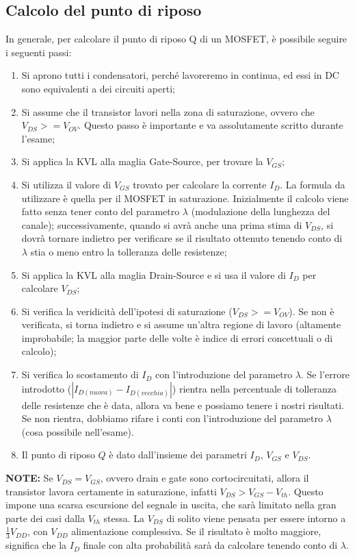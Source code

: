\documentclass[a4paper,twocolumn,notitlepage]{book}
\begin{document}
	\subsection*{Calcolo del punto di riposo}
	In generale, per calcolare il punto di riposo Q di un MOSFET, è possibile seguire i seguenti passi:
	\begin{enumerate}
		\item
		Si aprono tutti i condensatori, perché lavoreremo in continua, ed essi in DC sono equivalenti a dei circuiti aperti;
		\item
		Si assume che il transistor lavori nella zona di saturazione, ovvero che $V_{DS} >= V_{OV}$. Questo passo è importante e va assolutamente scritto durante l'esame;
		\item
		Si applica la KVL alla maglia Gate-Source, per trovare la $V_{GS}$;
		\item
		Si utilizza il valore di $V_{GS}$ trovato per calcolare la corrente $I_D$. La formula da utilizzare è quella per il MOSFET in saturazione.\newline
		Inizialmente il calcolo viene fatto senza tener conto del parametro $\lambda$ (modulazione della lunghezza del canale); successivamente, quando si avrà anche una prima stima di $V_{DS}$, si dovrà tornare indietro per verificare se il risultato ottenuto tenendo conto di $\lambda$ stia o meno entro la tolleranza delle resistenze;
		\item
		Si applica la KVL alla maglia Drain-Source e si usa il valore di $I_D$ per calcolare $V_{DS}$;
		\item
		Si verifica la veridicità dell'ipotesi di saturazione ($V_{DS} >= V_{OV}$). Se non è verificata, si torna indietro e si assume un'altra regione di lavoro (altamente improbabile; la maggior parte delle volte è indice di errori concettuali o di calcolo);
		\item
		Si verifica lo scostamento di $I_{D}$ con l'introduzione del parametro $\lambda$. Se l'errore introdotto ($|I_{D (nuova)} - I_{D (vecchia)}|$) rientra nella percentuale di tolleranza delle resistenze che è data, allora va bene e possiamo tenere i nostri risultati.\newline
		Se non rientra, dobbiamo rifare i conti con l'introduzione del parametro $\lambda$ (cosa possibile nell'esame).
		\item
		Il punto di riposo $Q$ è dato dall'insieme dei parametri $I_D$, $V_{GS}$ e $V_{DS}$.
		
			
		
	\end{enumerate}\medskip
	\textbf{NOTE:} Se $V_{DS}=V_{GS}$, ovvero drain e gate sono cortocircuitati, allora il transistor lavora certamente in saturazione, infatti $V_{DS} > V_{GS} - V_{th}$. Questo impone una scarsa escursione del segnale in uscita, che sarà limitato nella gran parte dei casi dalla $V_{th}$ stessa.
	La $V_{DS}$ di solito viene pensata per essere intorno a $\frac{1}{3}V_{DD}$, con $V_{DD}$ alimentazione complessiva. Se il risultato è molto maggiore, significa che la $I_{D}$ finale con alta probabilità sarà da calcolare tenendo conto di $\lambda$.
	
\end{document}
